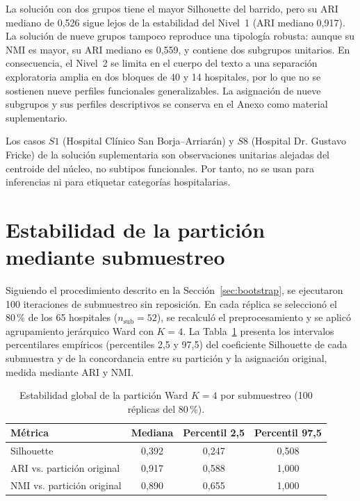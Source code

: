 La solución con dos grupos tiene el mayor Silhouette del barrido, pero su ARI
mediano de 0,526 sigue lejos de la estabilidad del Nivel~1 (ARI mediano
0,917). La solución de nueve grupos tampoco reproduce una tipología robusta:
aunque su NMI es mayor, su ARI mediano es 0,559, y contiene dos subgrupos
unitarios. En consecuencia, el Nivel~2 se limita en el cuerpo del texto a una
separación exploratoria amplia en dos bloques de 40 y 14 hospitales, por lo que no se
sostienen nueve perfiles funcionales generalizables. La asignación de nueve
subgrupos y sus perfiles descriptivos se conserva en el Anexo como material
suplementario.

Los casos $S1$ (Hospital Clínico San Borja--Arriarán) y $S8$ (Hospital Dr. Gustavo
Fricke) de la solución suplementaria son observaciones unitarias alejadas del
centroide del núcleo, no subtipos funcionales. Por tanto, no se usan para
inferencias ni para etiquetar categorías hospitalarias.

\section{Estabilidad de la partición mediante submuestreo}
\label{sec:res-estabilidad}

Siguiendo el procedimiento descrito en la Sección~\ref{sec:bootstrap}, se ejecutaron 100 iteraciones de submuestreo sin reposición. En cada réplica se seleccionó el $80\,\%$ de los 65 hospitales ($n_{\text{sub}}=52$), se recalculó el preprocesamiento y se aplicó agrupamiento jerárquico Ward con $K=4$. La Tabla~\ref{tab:estabilidad-global} presenta los intervalos percentilares empíricos (percentiles 2{,}5 y 97{,}5) del coeficiente Silhouette de cada submuestra y de la concordancia entre su partición y la asignación original, medida mediante ARI y NMI.

\begin{table}[htbp]
\centering
\caption{Estabilidad global de la partición Ward $K=4$ por submuestreo (100 réplicas del 80\,\%).}
\label{tab:estabilidad-global}
\begin{tabular}{l c c c}
\toprule
\textbf{Métrica} & \textbf{Mediana} & \textbf{Percentil 2,5} &
\textbf{Percentil 97,5} \\
\midrule
Silhouette & 0,392 & 0,247 & 0,508 \\
ARI vs. partición original & 0,917 & 0,588 & 1,000 \\
NMI vs. partición original & 0,890 & 0,655 & 1,000 \\
\bottomrule
\end{tabular}
\end{table}

